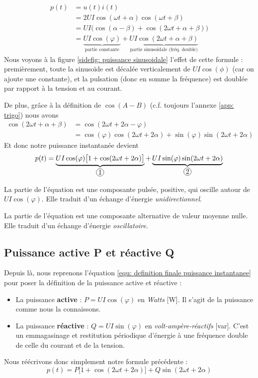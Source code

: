 \documentclass[12pt,a4paper]{article}
\begin{document}
\begin{equation}
	\begin{array}{ll}
		p(t) 	& = u(t)i(t)\\
				& = 2UI\cos(\omega t + \alpha)\cos(\omega t + \beta)\\
				& = UI\big(\cos(\alpha - \beta) + \cos(2\omega t + \alpha + \beta)\big)\\
				& = \underbrace{UI\cos(\varphi)}_{\text{partie constante}} + \underbrace{UI\cos(2\omega t + \alpha + \beta)}_{\text{partie sinusoïdale (fréq. double)}}
	\end{array}
\end{equation}
Nous voyons à la figure \ref{sidefig: puissance sinusoidale} l'effet de cette formule : premièrement, toute la sinusoïde est décalée verticalement de $UI\cos(\phi)$ (car on ajoute une constante), et la pulsation (donc en somme la fréquence) est doublée par rapport à la tension et au courant. 

De plus, grâce à la définition de $\cos(A - B)$ (c.f. toujours l'annexe \ref{app: trigo}) nous avons 
\[\begin{array}{ll}
	\cos(2\omega t + \alpha + \beta) & = \cos(2\omega t + 2 \alpha - \varphi)\\
		& =\cos(\varphi)\cos(2\omega t + 2\alpha) + \sin(\varphi)\sin(2\omega t + 2\alpha)
\end{array}\]
Et donc notre puissance instantanée devient
\begin{equation}
	p(t) = \underbrace{UI\cos(\varphi)\big[1 + \cos(2 \omega t + 2\alpha)\big]}_{\circled{1}} + \underbrace{UI \sin(\varphi)\sin(2\omega t + 2\alpha)}_{\circled{2}}
	\label{equ: definition finale puissance instantanee}
\end{equation}

La partie  de l'équation est une composante pulsée, positive, qui oscille autour de $UI\cos(\varphi)$. Elle traduit d'un échange d'énergie \textit{unidirectionnel}.

La partie  de l'équation est une composante alternative de valeur moyenne nulle. Elle traduit d'un échange d'énergie \textit{oscillatoire}.
\subsection{Puissance active P et réactive Q}
Depuis là, nous reprenons l'équation \ref{equ: definition finale puissance instantanee} pour poser la définition de la puissance active et réactive : 
\begin{itemize}
	\item 	La puissance \textbf{active} : $P = UI \cos(\varphi)$ en \textit{Watts} [W]. Il s'agit de la puissance comme nous la connaissons.
	\item 	La puissance \textbf{réactive} : $Q = UI\sin(\varphi)$ en \textit{volt-ampère-réactifs} [var]. C'est un emmagasinage  et restitution périodique d'énergie à une fréquence double de celle du courant et de la tension.
\end{itemize}
Nous réécrivons donc simplement notre formule précédente :
\begin{equation}
	p(t) = P\big[1+\cos(2\omega t + 2\alpha)\big] + Q\sin(2\omega t + 2 \alpha)
\end{equation}
\end{document}
